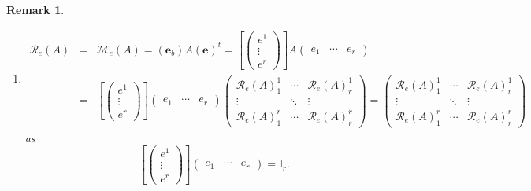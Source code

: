 \documentclass[aps,preprint]{revtex4}
\newtheorem{remark}[theorem]{Remark}
\begin{document}
\begin{remark}
\begin{enumerate}
\item 
\begin{eqnarray}
\mathcal{R}_{e}\left( A\right) &=&\mathcal{M}_{e}\left( A\right) =\left( 
\boldsymbol{e}_{b}\right) A\left( \boldsymbol{e}\right) ^{t}=\left[ \left( 
\begin{array}{c}
e^{1} \\ 
\vdots \\ 
e^{r}%
\end{array}%
\right) \right] A\left( 
\begin{array}{ccc}
e_{1} & \cdots & e_{r}%
\end{array}%
\right) \\
&=&\left[ \left( 
\begin{array}{c}
e^{1} \\ 
\vdots \\ 
e^{r}%
\end{array}%
\right) \right] \left( 
\begin{array}{ccc}
e_{1} & \cdots & e_{r}%
\end{array}%
\right) \left( 
\begin{array}{ccc}
\mathcal{R}_{e}\left( A\right) _{1}^{1} & \cdots & \mathcal{R}_{e}\left(
A\right) _{r}^{1} \\ 
\vdots & \ddots & \vdots \\ 
\mathcal{R}_{e}\left( A\right) _{1}^{r} & \cdots & \mathcal{R}_{e}\left(
A\right) _{r}^{r}%
\end{array}%
\right) =\left( 
\begin{array}{ccc}
\mathcal{R}_{e}\left( A\right) _{1}^{1} & \cdots & \mathcal{R}_{e}\left(
A\right) _{r}^{1} \\ 
\vdots & \ddots & \vdots \\ 
\mathcal{R}_{e}\left( A\right) _{1}^{r} & \cdots & \mathcal{R}_{e}\left(
A\right) _{r}^{r}%
\end{array}%
\right)
\end{eqnarray}%
as 
\begin{equation}
\left[ \left( 
\begin{array}{c}
e^{1} \\ 
\vdots \\ 
e^{r}%
\end{array}%
\right) \right] \left( 
\begin{array}{ccc}
e_{1} & \cdots & e_{r}%
\end{array}%
\right) =\mathbb{I}_{r}.
\end{equation}


\end{enumerate}
\end{remark}
\end{document}

